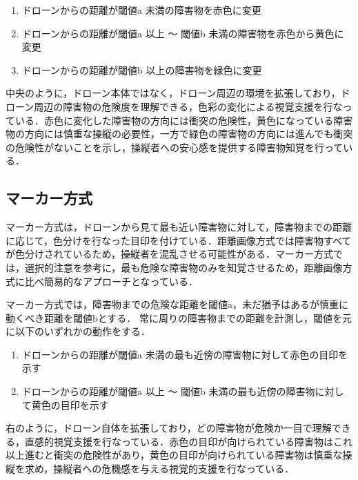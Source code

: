 \documentclass[submit, sigrecommended]{ipsj}
\begin{document}
\begin{enumerate}
	\item ドローンからの距離が閾値a 未満の障害物を赤色に変更
    
  \item ドローンからの距離が閾値a 以上 〜 閾値b 未満の障害物を赤色から黄色に変更
    
  \item ドローンからの距離が閾値b 以上の障害物を緑色に変更
\end{enumerate}

中央のように，ドローン本体ではなく，ドローン周辺の環境を拡張しており，ドローン周辺の障害物の危険度を理解できる，色彩の変化による視覚支援を行なっている．赤色に変化した障害物の方向には衝突の危険性，黄色になっている障害物の方向には慎重な操縦の必要性，一方で緑色の障害物の方向には進んでも衝突の危険性がないことを示し，操縦者への安心感を提供する障害物知覚を行っている．



\subsection{マーカー方式}
マーカー方式は，ドローンから見て最も近い障害物に対して，障害物までの距離に応じて，色分けを行なった目印を付けている．距離画像方式では障害物すべてが色分けされているため，操縦者を混乱させる可能性がある．マーカー方式では，選択的注意を参考に，最も危険な障害物のみを知覚させるため，距離画像方式に比べ簡易的なアプローチとなっている．
\par
マーカー方式では，障害物までの危険な距離を閾値a，未だ猶予はあるが慎重に動くべき距離を閾値bとする．
常に周りの障害物までの距離を計測し，閾値を元に以下のいずれかの動作をする．

\begin{enumerate}
	\item ドローンからの距離が閾値a 未満の最も近傍の障害物に対して赤色の目印を示す
    
    \item ドローンからの距離が閾値a 以上 〜 閾値b 未満の最も近傍の障害物に対して黄色の目印を示す
\end{enumerate}

右のように，ドローン自体を拡張しており，どの障害物が危険か一目で理解できる，直感的視覚支援を行なっている．赤色の目印が向けられている障害物はこれ以上進むと衝突の危険性があり，黄色の目印が向けられている障害物は慎重な操縦を求め，操縦者への危機感を与える視覚的支援を行なっている．
\end{document}
